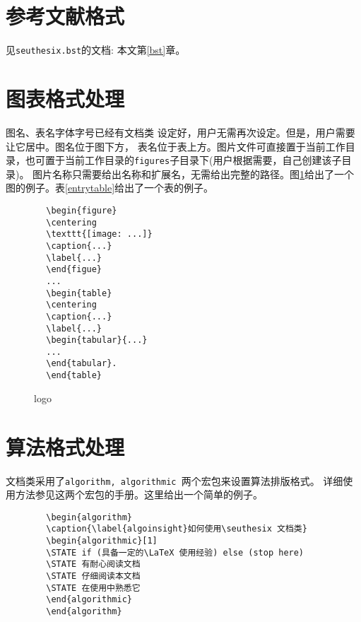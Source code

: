 \documentclass[figurelist,tablelist,algorithmlist,nomlist,masters]{seuthesix}
\begin{document}
	\section{参考文献格式}
	见\verb+seuthesix.bst+的文档: 本文第\ref{bst}章。

	\section{图表格式处理}
	图名、表名字体字号已经有文档类 设定好，用户无需再次设定。但是，用户需要让它居中。图名位于图下方，
	表名位于表上方。图片文件可直接置于当前工作目录，也可置于当前工作目录的\texttt{figures}子目录下(用户根据需要，自己创建该子目录)。
	图片名称只需要给出名称和扩展名，无需给出完整的路径。图\ref{logo}给出了一个图的例子。表\ref{entrytable}给出了一个表的例子。
	{\color{magenta}
		\begin{verbatim}
		\begin{figure}
		\centering
		\texttt{[image: ...]}
		\caption{...}
		\label{...}
		\end{figue}
		...
		\begin{table}
		\centering
		\caption{...}
		\label{...}
		\begin{tabular}{...}
		...
		\end{tabular}.
		\end{table}

		\end{verbatim}
	}

	\begin{figure}
		\centering
		\caption{\seuthesix logo\label{logo}}
		\chuhao \seuthesix
	\end{figure}

	\section{算法格式处理}
	\seuthesix 文档类采用了\texttt{algorithm, algorithmic }两个宏包来设置算法排版格式。
	详细使用方法参见这两个宏包的手册。这里给出一个简单的例子。
	{\color{magenta}
		\begin{verbatim}
		\begin{algorithm}
		\caption{\label{algoinsight}如何使用\seuthesix 文档类}
		\begin{algorithmic}[1]
		\STATE if (具备一定的\LaTeX 使用经验) else (stop here)
		\STATE 有耐心阅读文档
		\STATE 仔细阅读本文档
		\STATE 在使用中熟悉它
		\end{algorithmic}
		\end{algorithm}
		\end{verbatim}
	}
\end{document}
